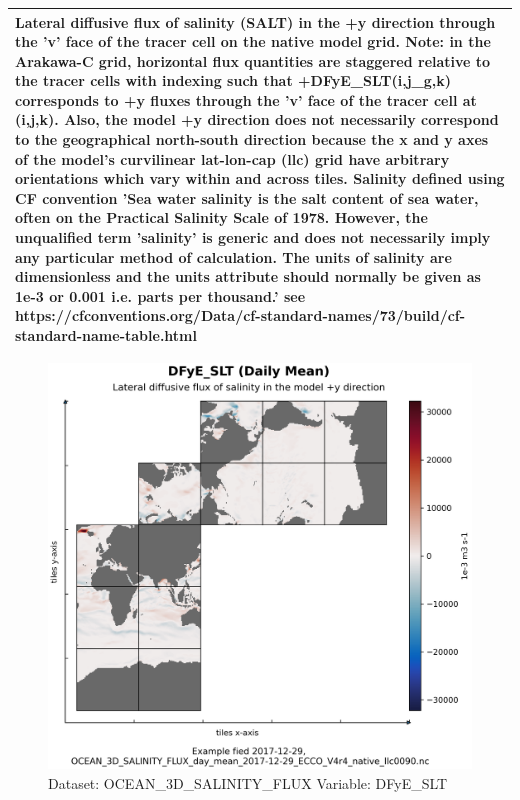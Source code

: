 \begin{longtable}{|m{}|m{}|m{}|m{}|}
\multicolumn{4}{|p{1\textwidth}|}{Lateral diffusive flux of salinity (SALT) in the +y direction through the 'v' face of the tracer cell on the native model grid. Note: in the Arakawa-C grid, horizontal flux quantities are staggered relative to the tracer cells with indexing such that +DFyE\_SLT(i,j\_g,k) corresponds to +y fluxes through the 'v' face of the tracer cell at (i,j,k). Also, the model +y direction does not necessarily correspond to the geographical north-south direction because the x and y axes of the model's curvilinear lat-lon-cap (llc) grid have arbitrary orientations which vary within and across tiles. Salinity defined using CF convention 'Sea water salinity is the salt content of sea water, often on the Practical Salinity Scale of 1978. However, the unqualified term 'salinity' is generic and does not necessarily imply any particular method of calculation. The units of salinity are dimensionless and the units attribute should normally be given as 1e-3 or 0.001 i.e. parts per thousand.' see https://cfconventions.org/Data/cf-standard-names/73/build/cf-standard-name-table.html} \\ \hline
\end{longtable}

\begin{figure}[H]
\centering
\includegraphics[scale=0.55]{../images/plots/native_plots/Ocean_Three-Dimensional_Salinity_Fluxes/DFyE_SLT.png}
\caption{Dataset: OCEAN\_3D\_SALINITY\_FLUX Variable: DFyE\_SLT}
\label{tab:table-OCEAN_3D_SALINITY_FLUX_DFyE_SLT-Plot}
\end{figure}
\pagebreak
